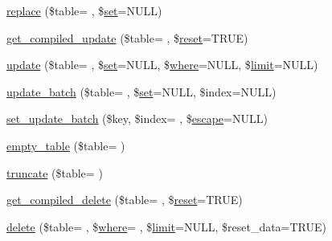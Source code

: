 \begin{DoxyCompactItemize}
\item 
\hyperlink{class_c_i___d_b__query__builder_a71a4809228dce3974013c0db36a5f281}{replace} (\$table= \textquotesingle{}\textquotesingle{}, \$\hyperlink{class_c_i___d_b__query__builder_ad24529c8e6cd4e3f58c0a3e55815b532}{set}=N\+U\+L\+L)
\item 
\hyperlink{class_c_i___d_b__query__builder_ac4dfdf5d7bf2a6545312ddb9711e8105}{get\+\_\+compiled\+\_\+update} (\$table= \textquotesingle{}\textquotesingle{}, \$\hyperlink{canvasjs_8js_a4603440e8345caceeed0d4f0bab77b2f}{reset}=T\+R\+U\+E)
\item 
\hyperlink{class_c_i___d_b__query__builder_a7f1bcfcca3cb9fe450f21737028040a7}{update} (\$table= \textquotesingle{}\textquotesingle{}, \$\hyperlink{class_c_i___d_b__query__builder_ad24529c8e6cd4e3f58c0a3e55815b532}{set}=N\+U\+L\+L, \$\hyperlink{class_c_i___d_b__query__builder_a2356c4b7b93fb83c62a354a8a0748222}{where}=N\+U\+L\+L, \$\hyperlink{class_c_i___d_b__query__builder_a875b0d4703f176c36e771d728a9a04a0}{limit}=N\+U\+L\+L)
\item 
\hyperlink{class_c_i___d_b__query__builder_a3a7d52e50b609117b3ca44a4dfeca263}{update\+\_\+batch} (\$table= \textquotesingle{}\textquotesingle{}, \$\hyperlink{class_c_i___d_b__query__builder_ad24529c8e6cd4e3f58c0a3e55815b532}{set}=N\+U\+L\+L, \$index=N\+U\+L\+L)
\item 
\hyperlink{class_c_i___d_b__query__builder_ad1ee3730f9e7ca2f6613a7bae29f61bf}{set\+\_\+update\+\_\+batch} (\$key, \$index= \textquotesingle{}\textquotesingle{}, \$\hyperlink{class_c_i___d_b__driver_ac8f37ca5703d4558c732e692194f8cd6}{escape}=N\+U\+L\+L)
\item 
\hyperlink{class_c_i___d_b__query__builder_adb594700d683271e17cc5041099d8d40}{empty\+\_\+table} (\$table= \textquotesingle{}\textquotesingle{})
\item 
\hyperlink{class_c_i___d_b__query__builder_a59e71805908a91d2b45089c0137b5bc7}{truncate} (\$table= \textquotesingle{}\textquotesingle{})
\item 
\hyperlink{class_c_i___d_b__query__builder_a0e5685905e73c6604c986e3f6e2ff973}{get\+\_\+compiled\+\_\+delete} (\$table= \textquotesingle{}\textquotesingle{}, \$\hyperlink{canvasjs_8js_a4603440e8345caceeed0d4f0bab77b2f}{reset}=T\+R\+U\+E)
\item 
\hyperlink{class_c_i___d_b__query__builder_a98c786dcc4964dbb2307636c523c1ebd}{delete} (\$table= \textquotesingle{}\textquotesingle{}, \$\hyperlink{class_c_i___d_b__query__builder_a2356c4b7b93fb83c62a354a8a0748222}{where}= \textquotesingle{}\textquotesingle{}, \$\hyperlink{class_c_i___d_b__query__builder_a875b0d4703f176c36e771d728a9a04a0}{limit}=N\+U\+L\+L, \$reset\+\_\+data=T\+R\+U\+E)

\end{DoxyCompactItemize}
